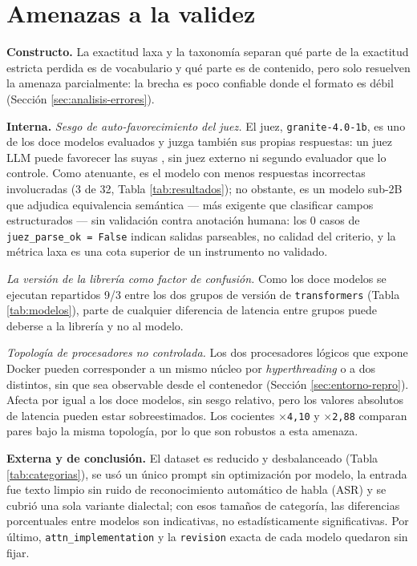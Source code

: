 \section{Amenazas a la validez}
\label{sec:amenazas}

\textbf{Constructo.} La exactitud laxa y la taxonomía separan qué parte de la
exactitud estricta perdida es de vocabulario y qué parte es de contenido,
pero solo resuelven la amenaza parcialmente: la brecha es poco confiable donde
el formato es débil (Sección \ref{sec:analisis-errores}).

\textbf{Interna.} \emph{Sesgo de auto-favorecimiento del juez.} El juez,
\texttt{granite-4.0-1b}, es uno de los doce modelos evaluados y juzga también
sus propias respuestas: un juez LLM puede favorecer las suyas
\cite{zheng2023judging}, sin juez externo ni segundo evaluador que lo
controle. Como atenuante, es el modelo con menos respuestas incorrectas
involucradas (3 de 32, Tabla \ref{tab:resultados}); no obstante, es un modelo
sub-2B que adjudica equivalencia semántica — más exigente que clasificar
campos estructurados — sin validación contra anotación humana: los 0 casos de
\texttt{juez\_parse\_ok = False} indican salidas parseables, no calidad del
criterio, y la métrica laxa es una cota superior de un instrumento no
validado.

\emph{La versión de la librería como factor de confusión.} Como los doce
modelos se ejecutan repartidos 9/3 entre los dos grupos de versión de
\texttt{transformers} (Tabla \ref{tab:modelos}), parte de cualquier
diferencia de latencia entre grupos puede deberse a la librería y no al
modelo.

\emph{Topología de procesadores no controlada.} Los dos procesadores lógicos
que expone Docker pueden corresponder a un mismo núcleo por
\emph{hyperthreading} o a dos distintos, sin que sea observable desde el
contenedor (Sección \ref{sec:entorno-repro}). Afecta por igual a los doce
modelos, sin sesgo relativo, pero los valores absolutos de latencia pueden
estar sobreestimados. Los cocientes \texttt{$\times$4,10} y
\texttt{$\times$2,88} comparan pares bajo la misma topología, por lo que son
robustos a esta amenaza.

\textbf{Externa y de conclusión.} El dataset es reducido y desbalanceado
(Tabla \ref{tab:categorias}), se usó un único
prompt sin optimización por modelo, la entrada fue texto limpio sin ruido de
reconocimiento
automático de habla (ASR) y se cubrió una sola variante dialectal; con esos
tamaños de categoría, las diferencias porcentuales entre modelos son
indicativas, no estadísticamente significativas. Por último,
\texttt{attn\_implementation} y la \texttt{revision} exacta de cada modelo
quedaron sin fijar.
